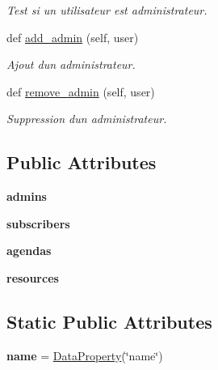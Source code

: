 \begin{DoxyCompactItemize}
\begin{DoxyCompactList}\small\item\em Test si un utilisateur est administrateur. \end{DoxyCompactList}\item 
def \mbox{\hyperlink{classSource_1_1core_1_1group_1_1Group_abf48501aa3d976ca92e2ea3194633b12}{add\+\_\+admin}} (self, user)
\begin{DoxyCompactList}\small\item\em Ajout d\textquotesingle{}un administrateur. \end{DoxyCompactList}\item 
def \mbox{\hyperlink{classSource_1_1core_1_1group_1_1Group_a08ca8a3d7a46d06841e454094b0d3504}{remove\+\_\+admin}} (self, user)
\begin{DoxyCompactList}\small\item\em Suppression d\textquotesingle{}un administrateur. \end{DoxyCompactList}\end{DoxyCompactItemize}
\subsection*{Public Attributes}
\begin{DoxyCompactItemize}
\item 
\mbox{\label{classSource_1_1core_1_1group_1_1Group_a68ae845c5772685e8cf75122f3472b9c}} 
{\bfseries admins}
\item 
\mbox{\label{classSource_1_1core_1_1group_1_1Group_abcd27cfb7adc97cef9bee0f89b8e1165}} 
{\bfseries subscribers}
\item 
\mbox{\label{classSource_1_1core_1_1group_1_1Group_ae553c76b852a126b4f35ee56427ab39d}} 
{\bfseries agendas}
\item 
\mbox{\label{classSource_1_1core_1_1group_1_1Group_a900634df8eb7a5e4a0e03e3f5eca8d7a}} 
{\bfseries resources}
\end{DoxyCompactItemize}
\subsection*{Static Public Attributes}
\begin{DoxyCompactItemize}
\item 
\mbox{\label{classSource_1_1core_1_1group_1_1Group_a7b142a5a7f8c054977bff8b2fd36ac18}} 
{\bfseries name} = \mbox{\hyperlink{classSource_1_1core_1_1dataproperty_1_1DataProperty}{Data\+Property}}(\char`\"{}name\char`\"{})
\end{DoxyCompactItemize}


